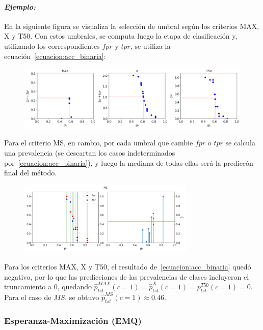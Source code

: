 \paragraph{\it Ejemplo:\/} En la siguiente figura se visualiza la selección de
umbral según los criterios MAX, X y T50. Con estos umbrales, se computa luego la
etapa de clasificación y, utilizando los correspondientes $fpr$ y $tpr$, se
utiliza la ecuación~\ref{ecuacion:acc_binaria}:
\begin{figure}[H]
    \includegraphics[width=\textwidth]{../plots_teoria/seleccion_umbrales_max_x_t50.png}
    \caption{}\label{fig:seleccion_umbrales_max_x_t50}
\end{figure}
Para el criterio MS, en cambio, por cada umbral que cambie $fpr$ o $tpr$ se
calcula una prevalencia (se descartan los casos indeterminados
por~\ref{ecuacion:acc_binaria}), y luego la mediana de todas ellas será la
prediccón final del método.
\begin{figure}[H]
    \centerline{\includegraphics[width=0.75\textwidth]{../plots_teoria/seleccion_umbrales_ms.png}}
    \caption{}\label{fig:seleccion_umbrales_ms}
\end{figure}
Para los criterios MAX, X y T50, el resultado de~\ref{ecuacion:acc_binaria}
quedó negativo, por lo que las predicciones de las prevalencias de clases
incluyeron el truncamiento a 0, quedando $\hat p^{MAX}_{tst}(c=1)=\hat
p^{X}_{tst}(c=1)=p^{T50}_{tst}(c=1)=0$. Para el caso de $MS$, se obtuvo $\hat
p^{MS}_{tst}(c=1) \approx  0.46$.

\subsubsection{Esperanza-Maximización (EMQ)}\label{puntual:emq}

